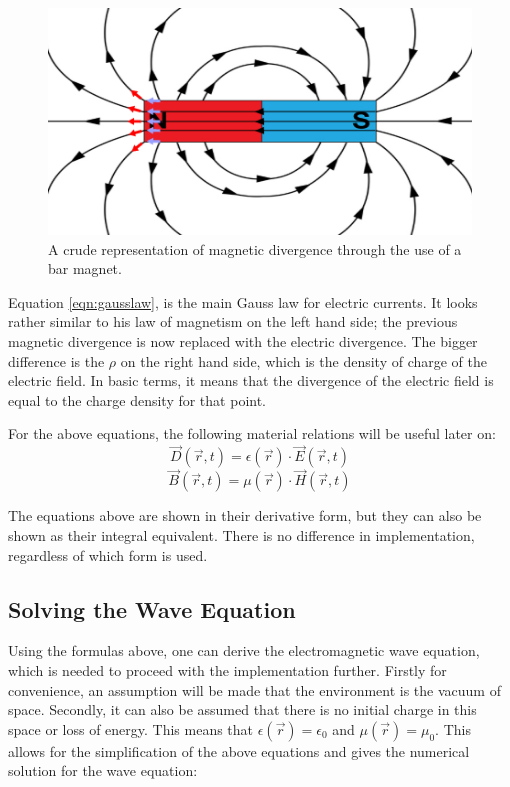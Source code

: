 \begin{figure}
	\centering
	\includegraphics[scale=0.9]{Figures/magneticdivergence}
	\decoRule
	\caption[Magnetic Divergence]{A crude representation of magnetic divergence through the use of a bar magnet.}
	\label{fig:magneticdivergence}
\end{figure}

Equation \ref{eqn:gausslaw}, is the main Gauss law for electric currents. It looks rather similar to his law of magnetism on the left hand side; the previous magnetic divergence is now replaced with the electric divergence. The bigger difference is the $\rho$ on the right hand side, which is the density of charge of the electric field. In basic terms, it means that the divergence of the electric field is equal to the charge density for that point.

For the above equations, the following material relations will be useful later on:
\begin{equation}
	 \vec{D}(\vec{r},t) = \epsilon(\vec{r}) \cdot \vec{E}(\vec{r},t)
\end{equation}
\begin{equation}
	\vec{B}(\vec{r},t) = \mu(\vec{r}) \cdot \vec{H}(\vec{r},t)
\end{equation}

The equations above are shown in their derivative form, but they can also be shown as their integral equivalent. There is no difference in implementation, regardless of which form is used.


\subsection{Solving the Wave Equation}
Using the formulas above, one can derive the electromagnetic wave equation, which is needed to proceed with the implementation further. Firstly for convenience, an assumption will be made that the environment is the vacuum of space. Secondly, it can also be assumed that there is no initial charge in this space or loss of energy. This means that $\epsilon(\vec{r})=\epsilon_{0}$ and $\mu(\vec{r})=\mu_{0}$. This allows for the simplification of the above equations and gives the numerical solution for the wave equation:

